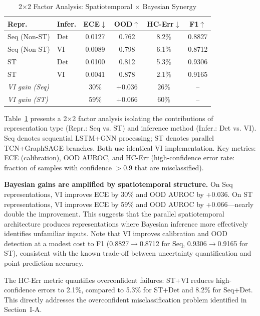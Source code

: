 \documentclass[lettersize,journal]{IEEEtran}
\begin{document}
\begin{table}[!t]
\caption{2$\times$2 Factor Analysis: Spatiotemporal $\times$ Bayesian Synergy\label{tab:synergy}}
\centering
\setlength{\tabcolsep}{3pt}
\begin{tabular}{llcccc}
\toprule
\textbf{Repr.} & \textbf{Infer.} & \textbf{ECE}$\downarrow$ & \textbf{OOD}$\uparrow$ & \textbf{HC-Err}$\downarrow$ & \textbf{F1}$\uparrow$ \\
\midrule
Seq (Non-ST) & Det & 0.0127 & 0.762 & 8.2\% & 0.8827 \\
Seq (Non-ST) & VI  & 0.0089 & 0.798 & 6.1\% & 0.8712 \\
ST           & Det & 0.0100 & 0.812 & 5.3\% & 0.9306 \\
ST           & VI  & 0.0041 & 0.878 & 2.1\% & 0.9165 \\
\midrule
\multicolumn{2}{l}{\textit{VI gain (Seq)}} & 30\% & +0.036 & 26\% & -- \\
\multicolumn{2}{l}{\textit{VI gain (ST)}}  & 59\% & +0.066 & 60\% & -- \\
\bottomrule
\end{tabular}
\end{table}


Table~\ref{tab:synergy} presents a 2$\times$2 factor analysis isolating the contributions of representation type (Repr.: Seq vs. ST) and inference method (Infer.: Det vs. VI). Seq denotes sequential LSTM+GNN processing; ST denotes parallel TCN+GraphSAGE branches. Both use identical VI implementation. Key metrics: ECE (calibration), OOD AUROC, and HC-Err (high-confidence error rate: fraction of samples with confidence $>$0.9 that are misclassified).

\textbf{Bayesian gains are amplified by spatiotemporal structure.} On Seq representations, VI improves ECE by 30\% and OOD AUROC by +0.036. On ST representations, VI improves ECE by 59\% and OOD AUROC by +0.066---nearly double the improvement. This suggests that the parallel spatiotemporal architecture produces representations where Bayesian inference more effectively identifies unfamiliar inputs. Note that VI improves calibration and OOD detection at a modest cost to F1 (0.8827$\to$0.8712 for Seq, 0.9306$\to$0.9165 for ST), consistent with the known trade-off between uncertainty quantification and point prediction accuracy.

The HC-Err metric quantifies overconfident failures: ST+VI reduces high-confidence errors to 2.1\%, compared to 5.3\% for ST+Det and 8.2\% for Seq+Det. This directly addresses the overconfident misclassification problem identified in Section~I-A.
\end{document}
